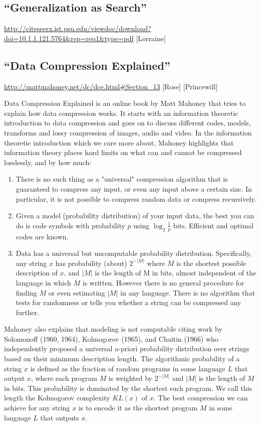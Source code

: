 \documentclass[12pt]{article}
\begin{document}
\newpage

\subsection*{“Generalization as Search”}
\url{http://citeseerx.ist.psu.edu/viewdoc/download?doi=10.1.1.121.5764&rep=rep1&type=pdf} [Lorraine]

\newpage 

\subsection*{“Data Compression Explained”}
\url{http://mattmahoney.net/dc/dce.html#Section_13} [Rose] [Princewill]

Data Compression Explained is an online book by Matt Mahoney that tries to explain how data compression works. It starts with an information theoretic introduction to data compression and goes on to discuss different codes, models, transforms and lossy compression of images, audio and video. In the information theoretic introduction which we care more about, Mahoney highlights that information theory places hard limits on what can and cannot be compressed losslessly, and by how much:
\begin{enumerate}
\item There is no such thing as a "universal" compression algorithm that is guaranteed to compress any input, or even any input above a certain size. In particular, it is not possible to compress random data or compress recursively.
\item Given a model (probability distribution) of your input data, the best you can do is code symbols with probability $p$ using $\log_2 \frac{1}{p}$ bits. Efficient and optimal codes are known.
\item Data has a universal but uncomputable probability distribution. Specifically, any string $x$ has probability (about) $2^{-|M|}$ where $M$ is the shortest possible description of $x$, and $|M|$ is the length of M in bits, almost independent of the language in which $M$ is written. However there is no general procedure for finding $M$ or even estimating $|M|$ in any language. There is no algorithm that tests for randomness or tells you whether a string can be compressed any further.
\end{enumerate}

Mahoney also explains that modeling is not computable citing work by Solomonoff (1960, 1964), Kolmogorov (1965), and Chaitin (1966) who independently proposed a universal a-priori probability distribution over strings based on their minimum description length. The algorithmic probability of a string $x$ is defined as the fraction of random programs in some language $L$ that output $x$, where each program $M$ is weighted by $2^{-|M|}$ and $|M|$ is the length of $M$ in bits. This probability is dominated by the shortest such program. We call this length the Kolmogorov complexity $KL(x)$ of $x$.
The best compression we can achieve for any string $x$ is to encode it as the shortest program $M$ in some language $L$ that outputs $x$.
\end{document}
